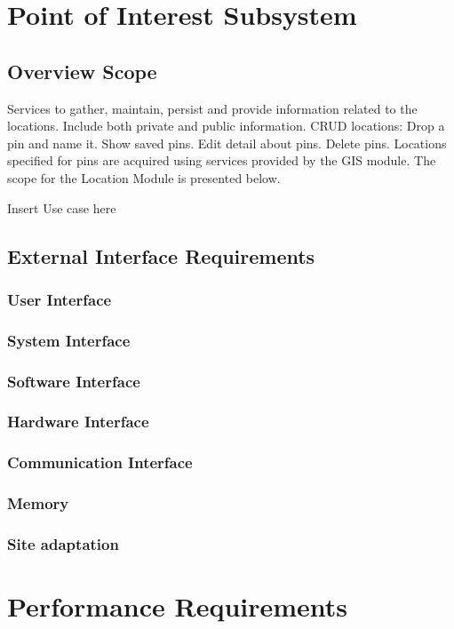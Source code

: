 \documentclass{article}
\begin{document}
\section{Point of Interest Subsystem}

\subsection{Overview Scope}
Services to gather, maintain, persist and provide information related to the locations.
Include both private and public information.
CRUD locations: Drop a pin and name it. Show saved pins. Edit detail about pins.
Delete pins. Locations specified for pins are acquired using services provided by the
GIS module.
The scope for the Location Module is presented below.

Insert Use case here

\subsection{External Interface Requirements}
\subsubsection{User Interface}
\subsubsection{System Interface}
\subsubsection{Software Interface}
\subsubsection{Hardware Interface}
\subsubsection{Communication Interface}
\subsubsection{Memory}
\subsubsection{Site adaptation}

\section{Performance Requirements}
\end{document}
